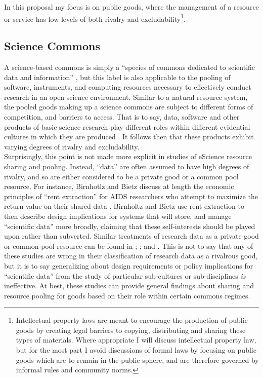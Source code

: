 \documentclass[thesis,tocnosub,noragright,centerchapter,12pt]{uiucecethesis09}
\begin{document}
In this proposal my focus is on public goods, where the management of a
resource or service has low levels of both rivalry and excludability\footnote{Intellectual property laws are meant to encourage the production of
public goods by creating legal barriers to copying,
distributing and sharing these types of materials. Where appropriate I
will discuss intellectual property law, but for the most part I avoid
discussions of formal laws by focusing on public goods which are to
remain in the public sphere, and are therefore governed by informal
rules and community norms.}.
\\

\subsection*{Science Commons}

A science-based commons is simply a ``species of commons dedicated to
scientific data and information'' \citep{contreras2010data}, but this label is
also applicable to the pooling of software, instruments, and computing
resources necessary to effectively conduct research in an open science
environment. Similar to a natural resource system, the pooled goods making
up a science commons are subject to different forms of competition, and
barriers to access. That is to say, data, software and other products of
basic science research play different roles within different evidential
cultures in which they are produced \citep{collins1998meaning}. It follows then
that these products exhibit varying degrees of rivalry and
excludability.\\

Surprisingly, this point is not made more explicit in studies of
eScience resource sharing and pooling. Instead, ``data'' are often
assumed to have high degrees of rivalry, and so are either considered to be a
private good or a common pool resource. For instance, Birnhotlz and
Bietz discuss at length the economic principles of ``rent extraction''
for AIDS researchers who attempt to maximize the return value on their
shared data \citeyearpar{birnholtz2003data}. Birnholtz and Bietz use rent extraction to then
describe design implications for systems that will store, and manage
``scientific data'' more broadly, claiming that these self-interests
should be played upon rather than subverted. Similar treatments of
research data as a private good or common-pool resource can be found in \citeyear{zimmerman2008new}; \citeyear{faniel2010reusing}; and \citeyear{tenopir2011data}. This is not to say that any of these studies are wrong in their
classification of research data as a rivalrous good, but it is to say
generalizing about design requirements or policy implications for
``scientific data'' from the study of particular sub-cultures or
sub-disciplines \emph{is} ineffective. At best, these studies can
provide general findings about sharing and resource pooling for goods
based on their role within certain commons regimes.\\
\end{document}
